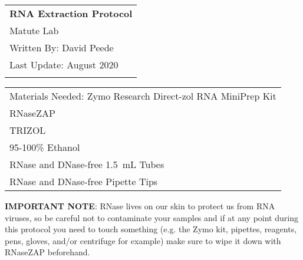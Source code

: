 \documentclass[a4paper,12pt]{article}
\begin{document}
\thispagestyle{empty} 

\begin{tabular}{p{15.5cm}} %
{\large \bf RNA Extraction Protocol} \\
Matute Lab \\ Written By: David Peede  \\ Last Update: August 2020\\
\hline %
\\
\end{tabular} %

\vspace*{0.3cm} %

\begin{tabular}{p{15.5cm}} %
	{\Large Materials Needed:} 
	\vspace{2mm}
	{Zymo Research Direct-zol RNA MiniPrep Kit} \\ {RNaseZAP}\\ {TRIZOL} \\ {95-100\% Ethanol} \\ {RNase and DNase-free \SI{1.5}{\milli\liter} Tubes} \\ {RNase and DNase-free Pipette Tips}
		
\end{tabular}

\vspace{0.4cm}

\textbf{IMPORTANT NOTE}: RNase lives on our skin to protect us from RNA viruses, so be careful not to contaminate your samples and if at any point during this protocol you need to touch something (e.g. the Zymo kit, pipettes, reagents, pens, gloves, and/or centrifuge for example) make sure to wipe it down with RNaseZAP beforehand. 
\end{document}
